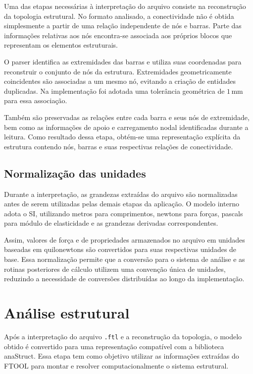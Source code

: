 Uma das etapas necessárias à interpretação do arquivo consiste na reconstrução da topologia estrutural. No formato analisado, a conectividade não é obtida simplesmente a partir de uma relação independente de nós e barras. Parte das informações relativas aos nós encontra-se associada aos próprios blocos que representam os elementos estruturais.

O parser identifica as extremidades das barras e utiliza suas coordenadas para reconstruir o conjunto de nós da estrutura. Extremidades geometricamente coincidentes são associadas a um mesmo nó, evitando a criação de entidades duplicadas. Na implementação foi adotada uma tolerância geométrica de \(1\,\mathrm{mm}\) para essa associação.

Também são preservadas as relações entre cada barra e seus nós de extremidade, bem como as informações de apoio e carregamento nodal identificadas durante a leitura. Como resultado dessa etapa, obtém-se uma representação explícita da estrutura contendo nós, barras e suas respectivas relações de conectividade.

\subsection{Normalização das unidades}
\label{subsec:normalizacao-unidades}

Durante a interpretação, as grandezas extraídas do arquivo são normalizadas antes de serem utilizadas pelas demais etapas da aplicação. O modelo interno adota o \gls{SI}, utilizando metros para comprimentos, newtons para forças, pascals para módulo de elasticidade e as grandezas derivadas correspondentes.

Assim, valores de força e de propriedades armazenados no arquivo em unidades baseadas em quilonewtons são convertidos para suas respectivas unidades de base. Essa normalização permite que a conversão para o sistema de análise e as rotinas posteriores de cálculo utilizem uma convenção única de unidades, reduzindo a necessidade de conversões distribuídas ao longo da implementação.

\section{Análise estrutural}
\label{sec:metodologia-analise}

Após a interpretação do arquivo \texttt{.ftl} e a reconstrução da topologia, o modelo obtido é convertido para uma representação compatível com a biblioteca anaStruct. Essa etapa tem como objetivo utilizar as informações extraídas do \acrshort{FTOOL} para montar e resolver computacionalmente o sistema estrutural.

